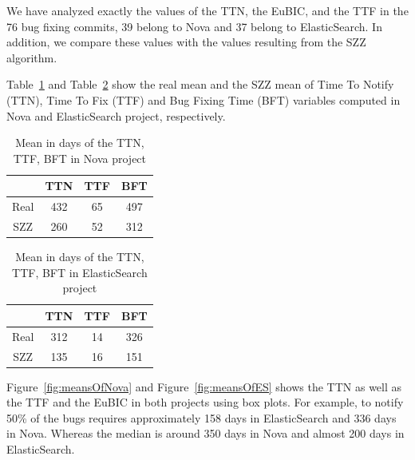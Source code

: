 \documentclass[10pt, conference]{IEEEtran}
\begin{document}
We have analyzed exactly the values of the TTN, the EuBIC, and the TTF in the 76 bug fixing commits, 39 belong to Nova and 37 belong to ElasticSearch. In addition, we compare these values with the values resulting from the SZZ algorithm.

Table~\ref{tableNova} and Table~\ref{tableES} show the real mean and the SZZ mean of Time To Notify (TTN), Time To Fix (TTF) and Bug Fixing Time (BFT) variables computed in Nova and ElasticSearch project, respectively. 

\begin{table}[!t]
\renewcommand{\arraystretch}{1.3}
\centering
\caption{Mean in days of the TTN, TTF, BFT in Nova project}
\label{tableNova}
\begin{tabular}{|c||c||c||c| }
\hline
  & TTN & TTF & BFT \\
\hline
Real & 432 & 65 & 497 \\
\hline
SZZ & 260 & 52 & 312\\
\hline
\end{tabular}
\end{table}

\begin{table}[!t]
\renewcommand{\arraystretch}{1.3}
\centering
\caption{Mean in days of the TTN, TTF, BFT in ElasticSearch project}
\label{tableES}
\begin{tabular}{|c||c||c||c| }
\hline
  & TTN & TTF & BFT \\
\hline
Real & 312 & 14 & 326 \\
\hline
SZZ & 135 & 16 & 151\\
\hline
\end{tabular}
\end{table}

Figure~\ref{fig:meansOfNova} and Figure~\ref{fig:meansOfES} shows the TTN as well as the TTF and the EuBIC in both projects using box plots. For example, to notify 50\% of the bugs requires approximately 158 days in ElasticSearch and 336 days in Nova. Whereas the median is around 350 days in Nova and almost 200 days in ElasticSearch.  
\end{document}
